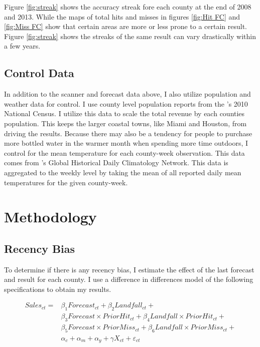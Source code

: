 \documentclass{article}
\begin{document}
 Figure \ref{fig:streak} shows the accuracy streak fore each county at the end of 2008 and 2013. While the maps of total hits and misses in figures \ref{fig:Hit FC} and \ref{fig:Miss FC} show that certain areas are more or less prone to a certain result. Figure \ref{fig:streak} shows the streaks of the same result can vary drastically within a few years. 

\subsection{Control Data}

In addition to the scanner and forecast data above, I also utilize population and weather data for control. I use county level population reports from the \citeauthor{USCB}'s 2010 National Census. I utilize this data to scale the total revenue by each counties population. This keeps the larger coastal towns, like Miami and Houston, from driving the results. Because there may also be a tendency for people to purchase more bottled water in the warmer month when spending more time outdoors, I control for the mean temperature for each county-week observation. This data comes from \citeauthor{GHCN}'s Global Historical Daily Climatology Network. This data is aggregated to the weekly level by taking the mean of all reported daily mean temperatures for the given county-week. 

\section{Methodology}

\subsection{Recency Bias}

To determine if there is any recency bias, I estimate the effect of the last forecast and result for each county. I use a difference in differences model of the following specifications to obtain my results.

\begin{equation}
    \begin{split}
       Sales_{ct} = &\beta_1 Forecast_{ct} + \beta_2 Landfall_{ct} +\\ 
			&\beta_3 Forecast \times Prior Hit_{ct} + \beta_4 Landfall \times Prior Hit_{ct} + \\
			&\beta_5 Forecast \times Prior Miss_{ct} + \beta_6 Landfall \times Prior Miss_{ct} + \\
			& \alpha_c + \alpha_m + \alpha_y + \gamma X_{ct} + \varepsilon_{ct}\\
			\label{eq:rec}
    \end{split}
\end{equation}
\end{document}
